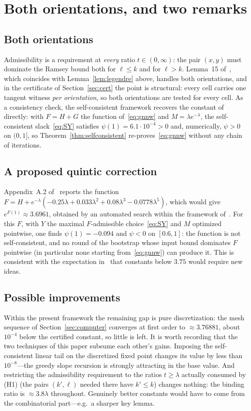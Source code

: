 \documentclass[11pt]{article}
\theoremstyle{definition}
\newcommand{\lam}{\lambda}
\begin{document}
\section{Both orientations, and two remarks}\label{sec:gap}

\subsection*{Both orientations}
Admissibility is a requirement at \emph{every} ratio $t\in(0,\infty)$: the pair $(x,y)$ must dominate the Ramsey bound both for $\ell\le k$ and for $\ell>k$.  Lemma~15 of~\cite{GNNW}, which coincides with Lemma~\ref{lem:legendre} above, handles both orientations, and in the certificate of Section~\ref{sec:cert} the point is structural: every cell carries one tangent witness \emph{per orientation}, so both orientations are tested for every cell.  As a consistency check, the self-consistent framework recovers the constant of~\cite{GNNW} directly: with $F=H+G$ the function of~\eqref{eq:gnnw} and $M=\lam e^{-\lam}$, the self-consistent slack~\eqref{eq:SY} satisfies $\psi(1)=6.1\cdot10^{-4}>0$ and, numerically, $\psi>0$ on $(0,1]$, so Theorem~\ref{thm:selfconsistent} re-proves~\eqref{eq:gnnw} without any chain of iterations.

\subsection*{A proposed quintic correction}
Appendix~A.2 of~\cite{HM} reports the function $F=H+e^{-\lam}(-0.25\lam+0.033\lam^2+0.08\lam^3-0.0778\lam^5)$, which would give $e^{F(1)}\approx3.6961$, obtained by an automated search within the framework of~\cite{GNNW}.  For this $F$, with $Y$ the maximal $F$-admissible choice~\eqref{eq:SY} and $M$ optimized pointwise, one finds $\psi(1)=-0.094$ and $\psi<0$ on $[0.6,1]$: the function is not self-consistent, and no round of the bootstrap whose input bound dominates $F$ pointwise (in particular none starting from~\eqref{eq:gnnw}) can produce it.  This is consistent with the expectation in~\cite[Remark~17]{GNNW} that constants below $3.75$ would require new ideas.

\subsection*{Possible improvements}
Within the present framework the remaining gap is pure discretization: the mesh sequence of Section~\ref{sec:computer} converges at first order to $\approx3.76881$, about $10^{-4}$ below the certified constant, so little is left.  It is worth recording that the two techniques of this paper subsume each other's gains.  Imposing the self-consistent linear tail on the discretized fixed point changes its value by less than $10^{-8}$---the greedy slope recursion is strongly attracting in the base value.  And restricting the admissibility requirement to the ratios $t\ge\lam$ actually consumed by (H1) (the pairs $(k',\ell)$ needed there have $k'\le k$) changes nothing: the binding ratio is $\approx3.8\lam$ throughout.  Genuinely better constants would have to come from the combinatorial part---e.g.\ a sharper key lemma.
\end{document}
